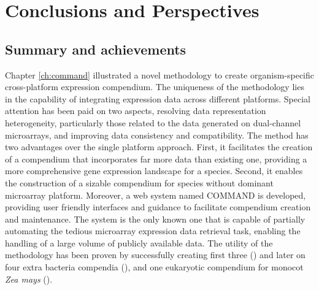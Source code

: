 \chapter{Conclusions and Perspectives}\label{ch:conclusion}

\instructionsconclusions



\section{Summary and achievements}

Chapter \ref{ch:command} illustrated a novel methodology to create organism-specific cross-platform expression compendium.   The uniqueness of the methodology lies in the capability of integrating expression data across different platforms. Special attention has been paid on two aspects, resolving data representation heterogeneity, particularly those related to the data generated on dual-channel microarrays, and improving data consistency and compatibility. The method has two advantages over the single platform approach.  First, it facilitates the creation of a compendium that incorporates far more data than existing one, providing a more comprehensive gene expression landscape for a species.  Second, it enables the construction of a sizable compendium for species without dominant microarray platform. Moreover, a web system named COMMAND is developed, providing user friendly interfaces and guidance to facilitate compendium creation and maintenance. The system is the only known one that is capable of partially automating the tedious microarray expression data retrieval task, enabling the handling of a large volume of publicly available data. The utility of the methodology has been proven by successfully creating first three (\cite{Engelen2011}) and later on four extra bacteria compendia (\cite{Meysman2014}), and one eukaryotic compendium for monocot \textit{Zea   mays} (\cite{Fu2014}).



